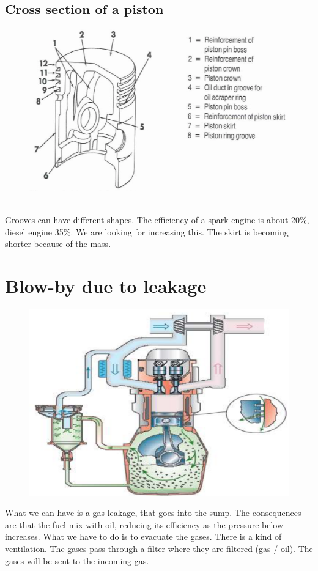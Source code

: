 \ \\\\
		\subsection{Cross section of a piston}
			\begin{figure}
			\vspace{-15mm}
			\includegraphics[scale=0.2]{ch1/15}
			\end{figure}
			\ \\ Grooves can have different shapes. The efficiency of a spark engine is about 20\%, diesel engine 35\%. We are looking for increasing this. The skirt is becoming shorter because of the mass. 
			
\section{Blow-by due to leakage}
			\begin{figure}
			\vspace{-5mm}
			\includegraphics[scale=0.2]{ch1/16}
			\end{figure}
			What we can have is a gas leakage, that goes into the sump. The consequences are that the fuel mix with oil, reducing its efficiency as the pressure below increases. What we have to do is to evacuate the gases. There is a kind of ventilation. The gases pass through a filter where they are filtered (gas / oil). The gases will be sent to the incoming gas. 
